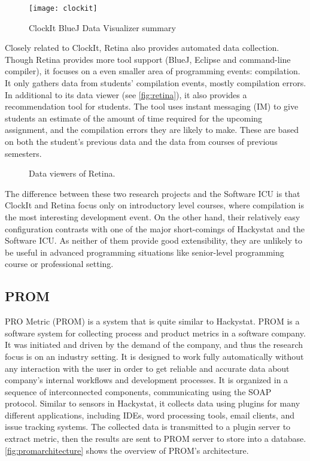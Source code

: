 \begin{figure}[htbp] %
   \centering
   \texttt{[image: clockit]} 
   \caption{ClockIt BlueJ Data Visualizer summary}
   \label{fig:clockit}
\end{figure}

Closely related to ClockIt, Retina also provides automated data collection. Though Retina provides more tool support (BlueJ, Eclipse and command-line compiler), it focuses on a even smaller area of programming events: compilation. It only gathers data from students' compilation events, mostly compilation errors. In additional to its data viewer (see \autoref{fig:retina}), it also provides a recommendation tool for students. The tool uses instant messaging (IM) to give students an estimate of the amount of time required for the upcoming assignment, and the compilation errors they are likely to make. These are based on both the student's previous data and the data from courses of previous semesters. 

\begin{figure}[htbp]
     \centering
          
     \caption{Data viewers of Retina.}
     \label{fig:retina}
\end{figure}

The difference between these two research projects and the Software ICU is that ClockIt and Retina focus only on introductory level courses, where compilation is the most interesting development event. On the other hand, their relatively easy configuration contrasts with one of the major short-comings of Hackystat and the Software ICU. As neither of them provide good extensibility, they are unlikely to be useful in advanced programming situations like senior-level programming course or professional setting.

\subsection {PROM}
PRO Metric (PROM) \cite{prom03} is a system that is quite similar to Hackystat. PROM is a software system for collecting process and product metrics in a software company. It was initiated and driven by the demand of the company, and thus the research focus is on an industry setting. It is designed to work fully automatically without any interaction with the user in order to get reliable and accurate data about company's internal workflows and development processes. It is organized in a sequence of interconnected components, communicating using the SOAP protocol. Similar to sensors in Hackystat, it collects data using plugins for many different applications, including IDEs, word processing tools, email clients, and issue tracking systems. The collected data is transmitted to a plugin server to extract metric, then the results are sent to PROM server to store into a database. \autoref{fig:promarchitecture} shows the overview of PROM's architecture.

